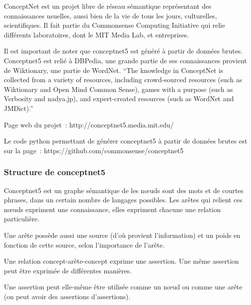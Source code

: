 \documentclass{article}           %
\begin{document}
ConceptNet est un projet libre de réseau sémantique représentant des connaissances usuelles, aussi bien de la vie de tous les jours, culturelles, scientifiques. Il fait partie du Commonsense Computing Initiative qui relie différents laboratoires, dont le MIT Media Lab, et entreprises.

Il est important de noter que conceptnet5 est généré à partir de données brutes. Conceptnet5 est relié à DBPedia, une grande partie de ses connaissances provient de Wiktionary, une partie de WordNet.
``The knowledge in ConceptNet is collected from a variety of resources, including crowd-sourced resources (such as Wiktionary and Open Mind Common Sense), games with a purpose (such as Verbosity and nadya.jp), and expert-created resources (such as WordNet and JMDict).''

Page web du projet~:
http://conceptnet5.media.mit.edu/

Le code python permettant de générer conceptnet5 à partir de données brutes est sur la page~:
https://github.com/commonsense/conceptnet5

\subsubsection{Structure de conceptnet5}

Conceptnet5 est un graphe sémantique de 
les n\oe{}uds sont des mots et de courtes phrases, dans un certain nombre de langages possibles. Les arêtes qui relient ces n\oe{}uds expriment une connaissance, elles expriment chacune une relation particulière.

Une arête possède aussi une source (d'où provient l'information) et un poids en fonction de cette source, selon l'importance de l'arête.

Une relation concept-arête-concept exprime une assertion. Une même assertion peut être exprimée de différentes manières.

Une assertion peut elle-même être utilisée comme un n\oe{}ud ou comme une arête (on peut avoir des assertions d'assertions).
\end{document}

